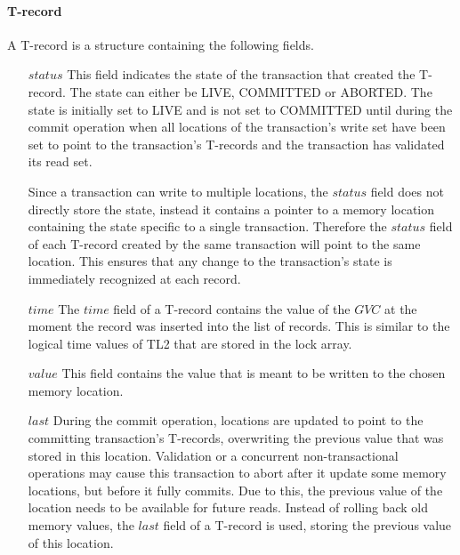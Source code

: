 \documentclass[11pt,letterpaper]{article}
\begin{document}
\paragraph{T-record}
A T-record is a structure containing the following fields.
\begin{itemize}
\vspace{-0.1cm}
\item[$\mathit{status}$]
This  field  indicates  the  state  of the  transaction  that  created  the
T-record. The  
state can either be LIVE, COMMITTED or ABORTED.
The state is initially set to LIVE and is not set to COMMITTED until during the commit operation when 
all locations of the transaction's write set have been set to point to the transaction's T-records
and the transaction has validated its read set.

Since a transaction can write to multiple locations, the $\mathit{status}$ field
does not directly store the state, instead it contains a
pointer to a memory location containing the state specific to a single transaction.
Therefore the $\mathit{status}$ field of each T-record created by the same transaction will point to the same location.
This ensures that any change to the transaction's state is immediately recognized at each record.
\vspace{-0.2cm}
\item[$\mathit{time}$]
The  $\mathit{time}$  field of  a T-record  contains the  
value of  the $\mathit{GVC}$  at  the  moment the  record  was 
inserted  into the  list of   records.
This is similar to the logical time values of TL2 that are stored in the lock array.
\vspace{-0.2cm}
\item[$\mathit{value}$]
This field contains the value that is meant to be written to the chosen 
memory location.
\vspace{-0.2cm}
\item[$\mathit{last}$]
During the commit operation, locations are updated to point
to the committing transaction's T-records, overwriting the previous value
that was stored in this location.
Validation or a concurrent non-transactional operations may cause this transaction to abort 
after it update some memory locations, but before
it fully commits.
Due to this, the previous value of the location needs to be available for future reads.
Instead of rolling back old memory values, the $\mathit{last}$ field of a T-record is used,
storing the previous value of this location.

\end{itemize}
\end{document}

